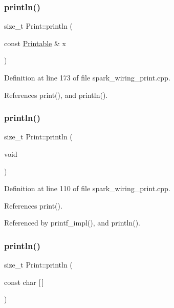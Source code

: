 \subsubsection{\texorpdfstring{println()}{println()}\hspace{0.1cm}{\footnotesize\ttfamily [9/21]}}
{\footnotesize\ttfamily size\+\_\+t Print\+::println (\begin{DoxyParamCaption}\item[{const \hyperlink{class_printable}{Printable} \&}]{x }\end{DoxyParamCaption})}



Definition at line 173 of file spark\+\_\+wiring\+\_\+print.\+cpp.



References print(), and println().

\mbox{\label{class_print_a169b128f9e22f0c15883768f580541a2}} 
\subsubsection{\texorpdfstring{println()}{println()}\hspace{0.1cm}{\footnotesize\ttfamily [10/21]}}
{\footnotesize\ttfamily size\+\_\+t Print\+::println (\begin{DoxyParamCaption}\item[{void}]{ }\end{DoxyParamCaption})}



Definition at line 110 of file spark\+\_\+wiring\+\_\+print.\+cpp.



References print().



Referenced by printf\+\_\+impl(), and println().

\mbox{\label{class_print_ad337ce3f7977411b7d34d47a51e5737e}} 
\subsubsection{\texorpdfstring{println()}{println()}\hspace{0.1cm}{\footnotesize\ttfamily [11/21]}}
{\footnotesize\ttfamily size\+\_\+t Print\+::println (\begin{DoxyParamCaption}\item[{const char}]{\mbox{[}$\,$\mbox{]} }\end{DoxyParamCaption})}



